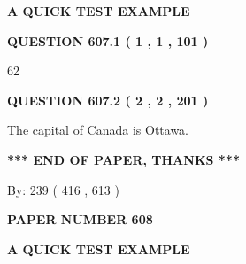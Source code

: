 \documentclass[12pt]{article}
\begin{document}
   
 \vspace{0.2in}
{\LARGE {\textbf{ A QUICK TEST EXAMPLE}}}
   
   
  
\vspace{0.2in}
  
{\textbf{\Large{QUESTION
607.1 
 ( 1 , 1 , 101 )
}}}
  
  
 
 
\noindent{}

62
 
 
  
\vspace{0.2in}
  
{\textbf{\Large{QUESTION
607.2 
 ( 2 , 2 , 201 )
}}}
  
  
 
 
\noindent{}
 
 
The capital of Canada is Ottawa.
 
 
 
 
   
   
 \vspace{0.2in}
 
   
   
   
   
\vspace{1.0in} 
{\textbf{\large{ *** END OF PAPER, THANKS *** }}} 
   
   
\hspace{1.0in} By: 
 239 ( 416 ,  613 )
   
   
   
   
\newpage 
\setcounter{page}{ 
   608001 } 
   
   
   
   
 {\textbf{ \Large{ PAPER NUMBER  608  }}}
   
   
\vspace{0.2in}
   
   
   
   
   
   
 \vspace{0.2in}
{\LARGE {\textbf{ A QUICK TEST EXAMPLE}}}
   
   
  
\vspace{0.2in}
  
\end{document}
